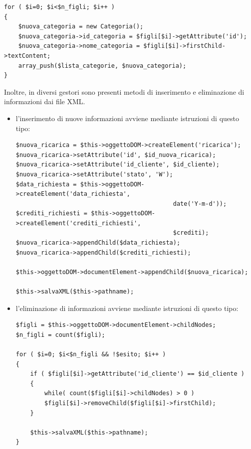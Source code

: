 \documentclass[a4paper, 14pt]{article}
\begin{document}
\begin{flushleft}
\begin{lstlisting}[backgroundcolor=\color{coloreSfondoGrammatiche}]
for ( $i=0; $i<$n_figli; $i++ )
{
	$nuova_categoria = new Categoria();
	$nuova_categoria->id_categoria = $figli[$i]->getAttribute('id');
	$nuova_categoria->nome_categoria = $figli[$i]->firstChild->textContent;
	array_push($lista_categorie, $nuova_categoria);
}
			\end{lstlisting}
			
			Inoltre, in diversi gestori sono presenti metodi di inserimento e eliminazione di informazioni dai file XML.
			\begin{itemize}
				\item l'inserimento di nuove informazioni avviene mediante istruzioni di questo tipo:
				\begin{lstlisting}[backgroundcolor=\color{coloreSfondoGrammatiche}]
$nuova_ricarica = $this->oggettoDOM->createElement('ricarica');
$nuova_ricarica->setAttribute('id', $id_nuova_ricarica);
$nuova_ricarica->setAttribute('id_cliente', $id_cliente);
$nuova_ricarica->setAttribute('stato', 'W');
$data_richiesta = $this->oggettoDOM->createElement('data_richiesta', 
											date('Y-m-d'));
$crediti_richiesti = $this->oggettoDOM->createElement('crediti_richiesti', 
											$crediti);
$nuova_ricarica->appendChild($data_richiesta);
$nuova_ricarica->appendChild($crediti_richiesti);

$this->oggettoDOM->documentElement->appendChild($nuova_ricarica);

$this->salvaXML($this->pathname);
				\end{lstlisting}				
				\item l'eliminazione di informazioni avviene mediante istruzioni di questo tipo:
				\begin{lstlisting}[backgroundcolor=\color{coloreSfondoGrammatiche}]
$figli = $this->oggettoDOM->documentElement->childNodes;
$n_figli = count($figli);

for ( $i=0; $i<$n_figli && !$esito; $i++ )
{
	if ( $figli[$i]->getAttribute('id_cliente') == $id_cliente )
	{
		while( count($figli[$i]->childNodes) > 0 )
		$figli[$i]->removeChild($figli[$i]->firstChild);
	}
	
	$this->salvaXML($this->pathname);
}
				\end{lstlisting}
			\end{itemize}

\end{flushleft}
\end{document}

